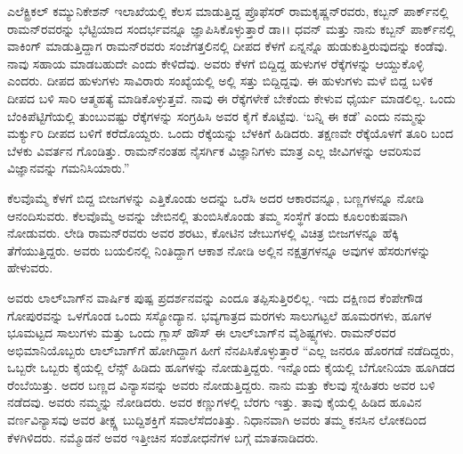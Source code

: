 ಎಲೆಕ್ಟ್ರಿಕಲ್ ಕಮ್ಯುನಿಕೇಶನ್ ಇಲಾಖೆಯಲ್ಲಿ ಕೆಲಸ ಮಾಡುತ್ತಿದ್ದ ಪ್ರೊಫೆಸರ್ ರಾಮಕೃಷ್ಣನ್‌ರವರು, ಕಬ್ಬನ್ ಪಾರ್ಕ್‌ನಲ್ಲಿ ರಾಮನ್‌ರವರನ್ನು ಭೆಟ್ಟಿಯಾದ ಸಂದರ್ಭವನ್ನೂ ಜ್ಞಾಪಿಸಿಕೊಳ್ಳುತ್ತಾರೆ  ಡಾ।। ಧವನ್ ಮತ್ತು ನಾನು ಕಬ್ಬನ್ ಪಾರ್ಕ್‌ನಲ್ಲಿ ವಾಕಿಂಗ್ ಮಾಡುತ್ತಿದ್ದಾಗ ರಾಮನ್‌ರವರು ಸಂಜೆಗತ್ತಲಿನಲ್ಲಿ ದೀಪದ ಕೆಳಗೆ ಏನ್ನನ್ನೊ ಹುಡುಕುತ್ತಿರುವುದನ್ನು ಕಂಡೆವು. ನಾವು ಸಹಾಯ ಮಾಡಬಹುದೇ ಎಂದು ಕೇಳಿದೆವು. ಅವರು ಕೆಳಗೆ ಬಿದ್ದಿದ್ದ ಹುಳುಗಳ ರೆಕ್ಕೆಗಳನ್ನು ಆಯ್ದುಕೊಳ್ಳಿ ಎಂದರು. ದೀಪದ ಹುಳುಗಳು ಸಾವಿರಾರು ಸಂಖ್ಯೆಯಲ್ಲಿ ಅಲ್ಲಿ ಸತ್ತು ಬಿದ್ದಿದ್ದವು. ಈ ಹುಳುಗಳು ಮಳೆ ಬಿದ್ದ ಬಳಿಕ ದೀಪದ ಬಳಿ ಸಾರಿ ಆತ್ಮಹತ್ಯೆ ಮಾಡಿಕೊಳ್ಳುತ್ತವೆ. ನಾವು ಈ ರೆಕ್ಕೆಗಳೇಕೆ ಬೇಕೆಂದು ಕೇಳುವ ಧೈರ್ಯ ಮಾಡಲಿಲ್ಲ. ಒಂದು ಬೆಂಕಿಪೆಟ್ಟಿಗೆಯಲ್ಲಿ ತುಂಬುವಷ್ಟು ರೆಕ್ಕೆಗಳನ್ನು ಸಂಗ್ರಹಿಸಿ ಅವರ ಕೈಗೆ ಕೊಟ್ಟೆವು. ‘ಬನ್ನಿ ಈ ಕಡೆ’ ಎಂದು ನಮ್ಮನ್ನು ಮರ್ಕ್ಯುರಿ ದೀಪದ ಬಳಿಗೆ ಕರೆದೊಯ್ದರು. ಒಂದು ರೆಕ್ಕೆಯನ್ನು ಬೆಳಕಿಗೆ ಹಿಡಿದರು. ತಕ್ಷಣವೇ ರೆಕ್ಕೆಯೊಳಗೆ ತೂರಿ ಬಂದ ಬೆಳಕು ವಿವರ್ತನ ಗೊಂಡಿತ್ತು. ರಾಮನ್‌ನಂತಹ ನೈಸರ್ಗಿಕ ವಿಜ್ಞಾನಿಗಳು ಮಾತ್ರ ಎಲ್ಲ ಜೀವಿಗಳನ್ನು ಆವರಿಸುವ ವಿಜ್ಞಾನವನ್ನು ಗಮನಿಸಿಯಾರು.” 

ಕೆಲವೊಮ್ಮೆ ಕೆಳಗೆ ಬಿದ್ದ ಬೀಜಗಳನ್ನು ಎತ್ತಿಕೊಂಡು ಅದನ್ನು ಒರೆಸಿ ಅದರ ಆಕಾರವನ್ನೂ, ಬಣ್ಣಗಳನ್ನೂ ನೋಡಿ ಆನಂದಿಸುವರು. ಕೆಲವೊಮ್ಮೆ ಅವನ್ನು ಜೇಬಿನಲ್ಲಿ ತುಂಬಿಸಿಕೊಂಡು ತಮ್ಮ ಸಂಸ್ಥೆಗೆ ತಂದು ಕೂಲಂಕುಷವಾಗಿ ನೋಡುವರು. ಲೇಡಿ ರಾಮನ್‌ರವರು ಅವರ ಶರಟು, ಕೋಟಿನ ಜೇಬುಗಳಲ್ಲಿ ವಿಚಿತ್ರ ಬೀಜಗಳನ್ನೂ ಹೆಕ್ಕಿ ತೆಗೆಯುತ್ತಿದ್ದರು. ಅವರು ಬಯಲಿನಲ್ಲಿ ನಿಂತಿದ್ದಾಗ ಆಕಾಶ ನೋಡಿ ಅಲ್ಲಿನ ನಕ್ಷತ್ರಗಳನ್ನೂ ಅವುಗಳ ಹೆಸರುಗಳನ್ನು ಹೇಳುವರು. 

ಅವರು ಲಾಲ್‌ಬಾಗ್‍ನ ವಾರ್ಷಿಕ ಪುಷ್ಪ ಪ್ರದರ್ಶನವನ್ನು ಎಂದೂ ತಪ್ಪಿಸುತ್ತಿರಲಿಲ್ಲ. ಇದು ದಕ್ಷಿಣದ ಕೆಂಪೇಗೌಡ ಗೋಪುರವನ್ನು ಒಳಗೊಂಡ ಒಂದು ಸಸ್ಯೋದ್ಯಾನ. ಭವ್ಯಗಾತ್ರದ ಮರಗಳು ಸಾಲುಗಟ್ಟಲೆ ಹೂಮರಗಳು, ಹೂಗಳ ಭೂಮಟ್ಟದ ಸಾಲುಗಳು ಮತ್ತು ಒಂದು ಗ್ಲಾಸ್ ಹೌಸ್ ಈ ಲಾಲ್‌ಬಾಗ್‍‌ನ ವೈಶಿಷ್ಟ್ಯಗಳು. ರಾಮನ್‌ರವರ ಅಭಿಮಾನಿಯೊಬ್ಬರು ಲಾಲ್‌ಬಾಗ್‌ಗೆ ಹೋಗಿದ್ದಾಗ ಹೀಗೆ ನೆನಪಿಸಿಕೊಳ್ಳುತ್ತಾರೆ “ಎಲ್ಲ ಜನರೂ ಹೊರಗಡೆ ನಡೆದಿದ್ದರು, ಒಬ್ಬರೇ ಒಬ್ಬರು ಕೈಯಲ್ಲಿ ಲೆನ್ಸ್ ಹಿಡಿದು ಹೂಗಳನ್ನು ನೋಡುತ್ತಿದ್ದರು. ಇನ್ನೊಂದು ಕೈಯಲ್ಲಿ ಬೆಗೋನಿಯಾ ಹೂಗಿಡದ ರೆಂಬೆಯಿತ್ತು. ಅದರ ಬಣ್ಣದ ವಿನ್ಯಾಸವನ್ನು ಅವರು ನೋಡುತ್ತಿದ್ದರು. ನಾನು ಮತ್ತು ಕೆಲವು ಸ್ನೇಹಿತರು ಅವರ ಬಳಿ ನಡೆದವು. ಅವರು ನಮ್ಮನ್ನು ನೋಡಿದರು. ಅವರ ಕಣ್ಣುಗಳಲ್ಲಿ ಬೆರಗು ಇತ್ತು. ತಾವು ಕೈಯಲ್ಲಿ ಹಿಡಿದ ಹೂವಿನ ವರ್ಣವಿನ್ಯಾಸವು ಅವರ ತೀಕ್ಷ್ಣ ಬುದ್ದಿಶಕ್ತಿಗೆ ಸವಾಲೆಸೆದಂತಿತ್ತು. ನಿಧಾನವಾಗಿ ಅವರು ತಮ್ಮ ಕನಸಿನ ಲೋಕದಿಂದ ಕೆಳಗಿಳಿದರು. ನಮ್ಮೊಡನೆ ಅವರ ಇತ್ತೀಚಿನ ಸಂಶೋಧನೆಗಳ ಬಗ್ಗೆ ಮಾತನಾಡಿದರು. 

